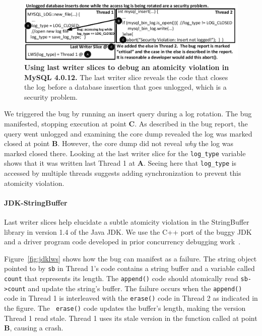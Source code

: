 \documentclass[preprint,9pt]{sigplanconf}
\begin{document}
\begin{figure}[h]
\centering
\includegraphics[width=\columnwidth]{figs/MySQLDebug.pdf}
\caption{\label{fig:mysqllws}{\bf Using last writer slices to debug an
atomicity violation in MySQL 4.0.12.} The last writer slice reveals the code that closes the log before a database insertion that goes unlogged, which is a security problem.}
\end{figure}

We triggered the bug by running an insert query during a log rotation.  The bug
manifested, stopping execution at point {\bf C}.  As described in the bug
report, the query went unlogged and examining the core dump revealed the log
was marked closed at point {\bf B}.  However, the core dump did not reveal {\em
why} the log was marked closed there.  Looking at the last writer slice for the
{\tt log\_type} variable shows that it was written last Thread 1 at {\bf A}.
Seeing here that {\tt log\_type} is accessed by multiple threads
suggests adding synchronization to prevent this atomicity violation.



\paragraph{JDK-StringBuffer}

Last writer slices help elucidate a subtle atomicity violation in the
StringBuffer library in version 1.4 of the Java JDK.  We use the C++ port of
the buggy JDK and a driver program code developed in prior concurrency debugging
work~\cite{concurrencybugs}.  


Figure~\ref{fig:jdklws} shows how the bug can manifest as a failure. The string
object pointed to by {\tt sb} in Thread 1's code contains a string buffer and a
variable called {\tt count} that represents its length.  The {\tt append()}
code should atomically read {\tt sb->count} and update the string's buffer.
The failure occurs when the {\tt append()} code in Thread 1 is interleaved with
the {\tt erase()} code in Thread 2 as indicated in the figure.  The {\tt
erase()} code updates the buffer's length, making the version Thread 1 read
stale.  Thread 1 uses its stale version in the function called at point {\bf
B}, causing a crash.  
\end{document}
